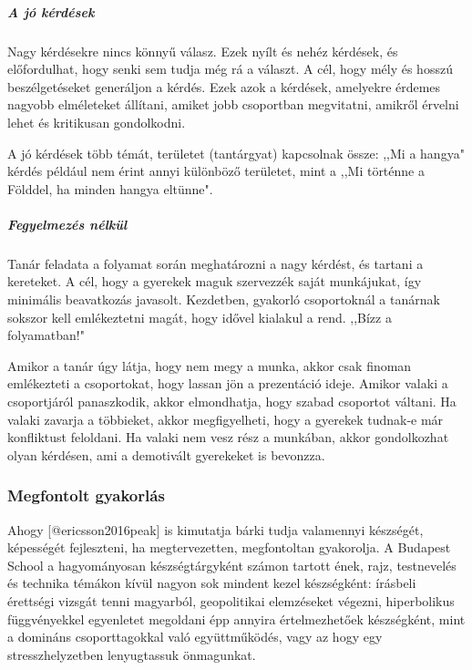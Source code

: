 \hypertarget{a-juxf3-kuxe9rduxe9sek}{%
\subparagraph{A jó kérdések}\label{a-juxf3-kuxe9rduxe9sek}}

Nagy kérdésekre nincs könnyű válasz. Ezek nyílt és nehéz kérdések, és
előfordulhat, hogy senki sem tudja még rá a választ. A cél, hogy mély és
hosszú beszélgetéseket generáljon a kérdés. Ezek azok a kérdések,
amelyekre érdemes nagyobb elméleteket állítani, amiket jobb csoportban
megvitatni, amikről érvelni lehet és kritikusan gondolkodni.

A jó kérdések több témát, területet (tantárgyat) kapcsolnak össze: ,,Mi
a hangya" kérdés például nem érint annyi különböző területet, mint a
,,Mi történne a Földdel, ha minden hangya eltünne".

\hypertarget{fegyelmezuxe9s-nuxe9lkuxfcl}{%
\subparagraph{Fegyelmezés nélkül}\label{fegyelmezuxe9s-nuxe9lkuxfcl}}

Tanár feladata a folyamat során meghatározni a nagy kérdést, és tartani
a kereteket. A cél, hogy a gyerekek maguk szervezzék saját munkájukat,
így minimális beavatkozás javasolt. Kezdetben, gyakorló csoportoknál a
tanárnak sokszor kell emlékeztetni magát, hogy idővel kialakul a rend.
,,Bízz a folyamatban!"

Amikor a tanár úgy látja, hogy nem megy a munka, akkor csak finoman
emlékezteti a csoportokat, hogy lassan jön a prezentáció ideje. Amikor
valaki a csoportjáról panaszkodik, akkor elmondhatja, hogy szabad
csoportot váltani. Ha valaki zavarja a többieket, akkor megfigyelheti,
hogy a gyerekek tudnak-e már konfliktust feloldani. Ha valaki nem vesz
rész a munkában, akkor gondolkozhat olyan kérdésen, ami a demotivált
gyerekeket is bevonzza.

\hypertarget{megfontolt-gyakorluxe1s}{%
\subsubsection{Megfontolt gyakorlás}\label{megfontolt-gyakorluxe1s}}

Ahogy {[}@ericsson2016peak{]} is kimutatja bárki tudja valamennyi
készségét, képességét fejleszteni, ha megtervezetten, megfontoltan
gyakorolja. A Budapest School a hagyományosan készségtárgyként számon
tartott ének, rajz, testnevelés és technika témákon kívül nagyon sok
mindent kezel készségként: írásbeli érettségi vizsgát tenni magyarból,
geopolitikai elemzéseket végezni, hiperbolikus függvényekkel egyenletet
megoldani épp annyira értelmezhetőek készségként, mint a domináns
csoporttagokkal való együttműködés, vagy az hogy egy stresszhelyzetben
lenyugtassuk önmagunkat.

